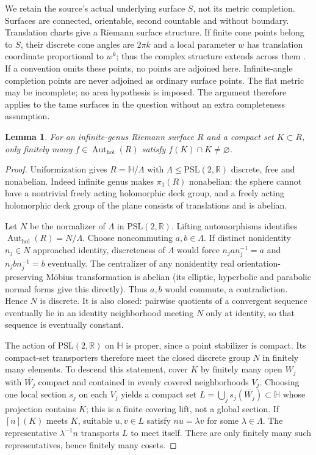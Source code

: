 \documentclass[11pt]{article}
\newtheorem{lemma}[theorem]{Lemma}
\newcommand{\Aut}{\operatorname{Aut}_{\mathrm{hol}}}
\begin{document}
We retain the source's actual underlying surface $S$, not its metric completion. Surfaces are connected, orientable, second countable and without boundary. Translation charts give a Riemann surface structure. If finite cone points belong to $S$, their discrete cone angles are $2\pi k$ and a local parameter $w$ has translation coordinate proportional to $w^k$; thus the complex structure extends across them \cite[p.~676]{PSV}. If a convention omits these points, no points are adjoined here. Infinite-angle completion points are never adjoined as ordinary surface points. The flat metric may be incomplete; no area hypothesis is imposed. The argument therefore applies to the tame surfaces in the question without an extra completeness assumption.

\begin{lemma}\label{proper}
For an infinite-genus Riemann surface $R$ and a compact set $K\subset R$, only finitely many $f\in\Aut(R)$ satisfy $f(K)\cap K\ne\varnothing$.
\end{lemma}
\begin{proof}
Uniformization gives $R=\mathbb H/\Lambda$ with $\Lambda\leq\mathrm{PSL}(2,\mathbb R)$ discrete, free and nonabelian. Indeed infinite genus makes $\pi_1(R)$ nonabelian: the sphere cannot have a nontrivial freely acting holomorphic deck group, and a freely acting holomorphic deck group of the plane consists of translations and is abelian.

Let $N$ be the normalizer of $\Lambda$ in $\mathrm{PSL}(2,\mathbb R)$. Lifting automorphisms identifies $\Aut(R)=N/\Lambda$. Choose noncommuting $a,b\in\Lambda$. If distinct nonidentity $n_j\in N$ approached identity, discreteness of $\Lambda$ would force $n_ja n_j^{-1}=a$ and $n_jb n_j^{-1}=b$ eventually. The centralizer of any nonidentity real orientation-preserving M\"obius transformation is abelian (its elliptic, hyperbolic and parabolic normal forms give this directly). Thus $a,b$ would commute, a contradiction. Hence $N$ is discrete. It is also closed: pairwise quotients of a convergent sequence eventually lie in an identity neighborhood meeting $N$ only at identity, so that sequence is eventually constant.

The action of $\mathrm{PSL}(2,\mathbb R)$ on $\mathbb H$ is proper, since a point stabilizer is compact. Its compact-set transporters therefore meet the closed discrete group $N$ in finitely many elements. To descend this statement, cover $K$ by finitely many open $W_j$ with $\overline{W_j}$ compact and contained in evenly covered neighborhoods $V_j$. Choosing one local section $s_j$ on each $V_j$ yields a compact set $L=\bigcup_j s_j(\overline{W_j})\subset\mathbb H$ whose projection contains $K$; this is a finite covering lift, not a global section. If $[n](K)$ meets $K$, suitable $u,v\in L$ satisfy $nu=\lambda v$ for some $\lambda\in\Lambda$. The representative $\lambda^{-1}n$ transports $L$ to meet itself. There are only finitely many such representatives, hence finitely many cosets.
\end{proof}
\end{document}
